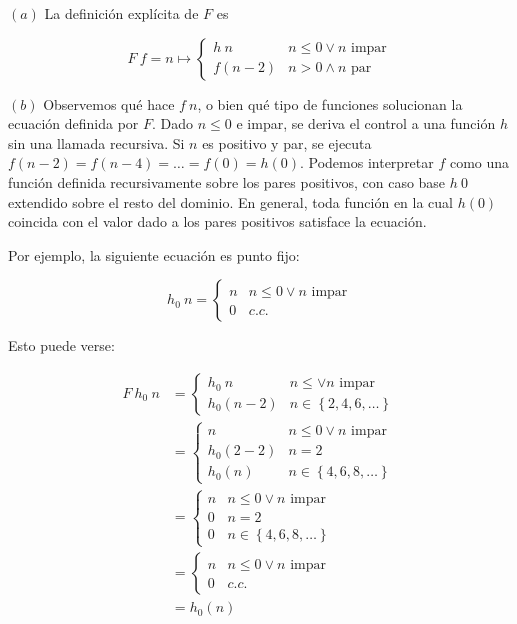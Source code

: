 \documentclass[a4paper, 12pt]{article}
\begin{document}
$(a)$ La definición explícita de $F$ es 

\begin{equation*}
  F ~ f  = n \mapsto  \begin{cases}
    h ~ n & n \leq 0 \lor  n \text{ impar} \\ 
    f(n-2) & n > 0 \land n \text{ par}
  \end{cases}
\end{equation*}

$(b)$ Observemos qué hace $f ~ n$, o bien qué tipo de funciones solucionan la
ecuación definida por $F$. Dado $n \leq 0$ e impar, se deriva el control a una
función $h$ sin una llamada recursiva. Si $n$ es positivo y par, se ejecuta
$f(n-2) = f(n-4)= \ldots= f(0) = h(0)$. Podemos interpretar $f$ como una función
definida recursivamente sobre los pares positivos, con caso base $h ~ 0$
extendido sobre el resto del dominio. En general, toda función en la cual $h(0)$
coincida con el valor dado a los pares positivos satisface la ecuación.

Por ejemplo, la siguiente ecuación es punto fijo:

\begin{equation*}
  h_0 ~ n = \begin{cases}
    n & n \leq 0 \lor n \text{ impar} \\ 
    0 & c.c.
  \end{cases}
\end{equation*}

Esto puede verse:

\begin{align*}
  F ~ h_0 ~ n &= \begin{cases}
    h_0 ~ n & n\leq \lor  n \text{ impar} \\ 
    h_0(n-2) & n \in \left\{ 2, 4, 6,\ldots \right\} 
  \end{cases} \\ 
  &=\begin{cases}
    n & n \leq 0 \lor  n \text{ impar} \\ 
    h_0(2-2) & n = 2 \\ 
    h_0(n) & n \in \left\{ 4, 6, 8,\ldots \right\} 
  \end{cases}\\
  &= \begin{cases}
    n & n \leq 0 \lor n \text{ impar}\\ 
    0 & n = 2 \\ 
    0 & n \in \left\{ 4, 6, 8, \ldots \right\} 
  \end{cases} \\ 
  &=\begin{cases}
    n & n \leq 0 \lor  n \text{ impar} \\ 
    0 & c.c.
  \end{cases}\\
  &= h_0(n)
\end{align*}
\end{document}
